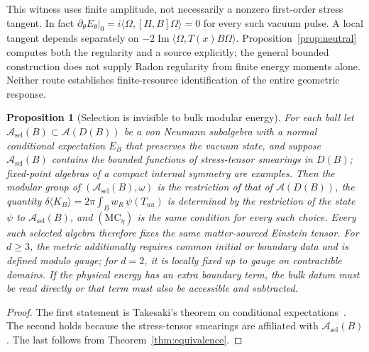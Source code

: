\documentclass[12pt]{article}
\newtheorem{proposition}[theorem]{Proposition}
\theoremstyle{definition}
\theoremstyle{remark}
\newcommand{\ev}[1]{\langle #1\rangle}
\begin{document}
This witness uses finite amplitude, not necessarily a nonzero first-order
stress tangent. In fact
\(\partial_\theta E_\theta|_0=i\langle\Omega,[H,B]\Omega\rangle=0\)
for every such vacuum pulse. A local tangent depends separately on
\(-2\operatorname{Im}\langle\Omega,T(x)B\Omega\rangle\).
Proposition~\ref{prop:neutral} computes both the regularity and a source
explicitly; the general bounded construction does not supply Radon regularity
from finite energy moments alone. Neither route establishes finite-resource
identification of the entire geometric response.

\begin{proposition}[Selection is invisible to bulk modular energy]\label{prop:selection}
For each ball let \(\mathcal A_{\mathrm{sel}}(B)\subset\mathcal A(D(B))\) be a von Neumann
subalgebra with a normal conditional expectation \(E_B\) that preserves the vacuum state,
and suppose \(\mathcal A_{\mathrm{sel}}(B)\) contains the bounded functions of stress-tensor
smearings in \(D(B)\); fixed-point algebras of a compact internal symmetry are examples.
Then the modular group of \((\mathcal A_{\mathrm{sel}}(B),\omega)\) is the restriction of that
of \(\mathcal A(D(B))\), the quantity \(\delta\ev{K_B}=2\pi\int_Bw_R\,\psi(T_{uu})\) is
determined by the restriction of the state \(\psi\) to \(\mathcal A_{\mathrm{sel}}(B)\), and
\((\mathrm{MC}_\eta)\) is the same condition for every such choice. Every such selected
algebra therefore fixes the same matter-sourced Einstein tensor. For \(d\ge3\), the
metric additionally requires common initial or boundary data and is defined modulo
gauge; for \(d=2\), it is locally fixed up to gauge on contractible domains.
If the physical energy has an extra boundary term, the bulk datum must be read directly
or that term must also be accessible and subtracted.
\end{proposition}

\begin{proof}
The first statement is Takesaki's theorem on conditional
expectations~\cite{Takesaki1972}. The second holds because the stress-tensor smearings are
affiliated with \(\mathcal A_{\mathrm{sel}}(B)\). The last follows from
Theorem~\ref{thm:equivalence}.
\end{proof}
\end{document}
